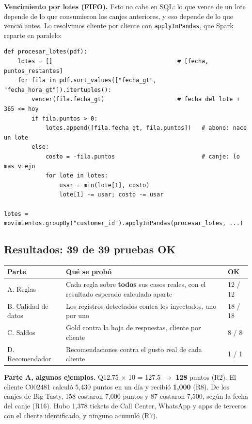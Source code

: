 \documentclass[12pt,a4paper]{article}
\begin{document}
\textbf{Vencimiento por lotes (FIFO).} Esto no cabe en SQL: lo que vence de un lote depende de lo
que consumieron los canjes anteriores, y eso depende de lo que venció antes. Lo resolvimos cliente
por cliente con \texttt{applyInPandas}, que Spark reparte en paralelo:

\begin{verbatim}
def procesar_lotes(pdf):
    lotes = []                                    # [fecha, puntos_restantes]
    for fila in pdf.sort_values(["fecha_gt", "fecha_hora_gt"]).itertuples():
        vencer(fila.fecha_gt)                     # fecha del lote + 365 <= hoy
        if fila.puntos > 0:
            lotes.append([fila.fecha_gt, fila.puntos])   # abono: nace un lote
        else:
            costo = -fila.puntos                         # canje: lo mas viejo
            for lote in lotes:
                usar = min(lote[1], costo)
                lote[1] -= usar; costo -= usar

lotes = movimientos.groupBy("customer_id").applyInPandas(procesar_lotes, ...)
\end{verbatim}

\subsection{Resultados: 39 de 39 pruebas OK}

\begin{center}
\renewcommand{\arraystretch}{1.4}
\begin{tabular}{|>{\raggedright\arraybackslash}p{4.2cm}|>{\raggedright\arraybackslash}p{7.2cm}|p{1.6cm}|}
\hline
\textbf{Parte} & \textbf{Qué se probó} & \textbf{OK} \\
\hline
A. Reglas & Cada regla sobre \textbf{todos} sus casos reales, con el resultado esperado calculado
aparte & 12 / 12 \\
\hline
B. Calidad de datos & Los registros detectados contra los inyectados, uno por uno & 18 / 18 \\
\hline
C. Saldos & Gold contra la hoja de respuestas, cliente por cliente & 8 / 8 \\
\hline
D. Recomendador & Recomendaciones contra el gusto real de cada cliente & 1 / 1 \\
\hline
\end{tabular}
\end{center}

\textbf{Parte A, algunos ejemplos.} Q12.75 $\times$ 10 = 127.5 $\rightarrow$ \textbf{128} puntos
(R2). El cliente C002481 calculó 5,430 puntos en un día y recibió \textbf{1,000} (R8). De los
canjes de Big Tasty, 158 costaron 7,000 puntos y 87 costaron 7,500, según la fecha del canje
(R16). Hubo 1,378 tickets de Call Center, WhatsApp y apps de terceros con el cliente identificado,
y ninguno acumuló (R7).
\end{document}
